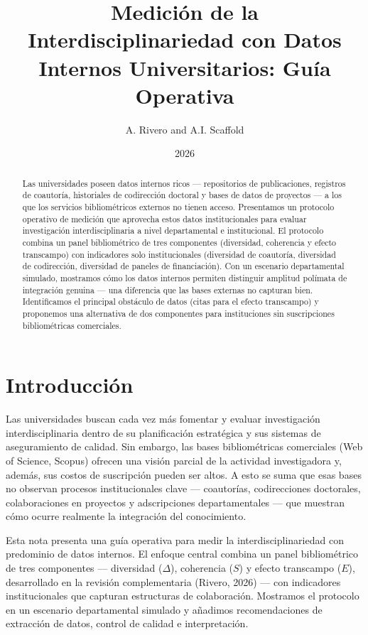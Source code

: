 \documentclass[
]{article}
\title{Medición de la Interdisciplinariedad con Datos Internos
Universitarios: Guía Operativa}
\author{A. Rivero and A.I. Scaffold}
\date{2026}
\begin{document}
\maketitle
\begin{abstract}
Las universidades poseen datos internos ricos --- repositorios de
publicaciones, registros de coautoría, historiales de codirección
doctoral y bases de datos de proyectos --- a los que los servicios
bibliométricos externos no tienen acceso. Presentamos un protocolo
operativo de medición que aprovecha estos datos institucionales para
evaluar investigación interdisciplinaria a nivel departamental e
institucional. El protocolo combina un panel bibliométrico de tres
componentes (diversidad, coherencia y efecto transcampo) con indicadores
solo institucionales (diversidad de coautoría, diversidad de
codirección, diversidad de paneles de financiación). Con un escenario
departamental simulado, mostramos cómo los datos internos permiten
distinguir amplitud polímata de integración genuina --- una diferencia
que las bases externas no capturan bien. Identificamos el principal
obstáculo de datos (citas para el efecto transcampo) y proponemos una
alternativa de dos componentes para instituciones sin suscripciones
bibliométricas comerciales.
\end{abstract}

\hypertarget{introducciuxf3n}{%
\section{Introducción}\label{introducciuxf3n}}

Las universidades buscan cada vez más fomentar y evaluar investigación
interdisciplinaria dentro de su planificación estratégica y sus sistemas
de aseguramiento de calidad. Sin embargo, las bases bibliométricas
comerciales (Web of Science, Scopus) ofrecen una visión parcial de la
actividad investigadora y, además, sus costos de suscripción pueden ser
altos. A esto se suma que esas bases no observan procesos
institucionales clave --- coautorías, codirecciones doctorales,
colaboraciones en proyectos y adscripciones departamentales --- que
muestran cómo ocurre realmente la integración del conocimiento.

Esta nota presenta una guía operativa para medir la
interdisciplinariedad con predominio de datos internos. El enfoque
central combina un panel bibliométrico de tres componentes ---
diversidad (\(\Delta\)), coherencia (\(S\)) y efecto transcampo (\(E\)),
desarrollado en la revisión complementaria (Rivero, 2026) --- con
indicadores institucionales que capturan estructuras de colaboración.
Mostramos el protocolo en un escenario departamental simulado y añadimos
recomendaciones de extracción de datos, control de calidad e
interpretación.
\end{document}
